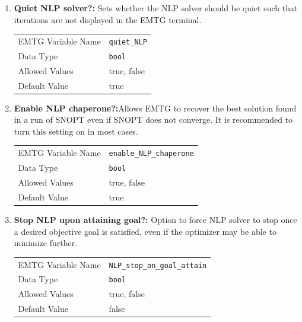 \begin{enumerate}
    \item \textbf{Quiet \ac{NLP} solver?:} Sets whether the \ac{NLP} solver should be quiet such that iterations are not displayed in the \ac{EMTG} terminal.
        \begin{table}[H]
            \hspace{2cm}
            \begin{tabular}{lp{5cm}}
            \ac{EMTG} Variable Name & \verb|quiet_NLP| \\
            Data Type & \verb|bool| \\
            Allowed Values & true, false \\
            Default Value & true \\
            \end{tabular}
        \end{table}

    \item \textbf{Enable \ac{NLP} chaperone?:}{Allows \ac{EMTG} to recover the best solution found in a run of \ac{SNOPT} even if \ac{SNOPT} does not converge. It is recommended to turn this setting on in most cases.}
        \begin{table}[H]
            \hspace{2cm}
            \begin{tabular}{lp{5cm}}
            \ac{EMTG} Variable Name & \verb|enable_NLP_chaperone| \\
            Data Type & \verb|bool| \\
            Allowed Values & true, false \\
            Default Value & true \\
            \end{tabular}
        \end{table}

    \item \textbf{Stop \ac{NLP} upon attaining goal?:} Option to force \ac{NLP} solver to stop once a desired objective goal is satisfied, even if the optimizer may be able to minimize further.
        \begin{table}[H]
            \hspace{2cm}
            \begin{tabular}{lp{5cm}}
            \ac{EMTG} Variable Name & \verb|NLP_stop_on_goal_attain| \\
            Data Type & \verb|bool| \\
            Allowed Values & true, false \\
            Default Value & false \\
            \end{tabular}
        \end{table}


\end{enumerate}
